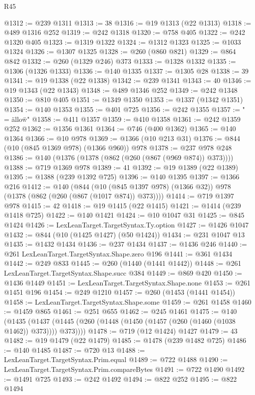 \begin{lexlean}{R45}
\begin{coremodule}
@1312 := @239 @1311
@1313 := 38
@1316 := @19 @1313 (@22 @1313)
@1318 := @489 @1316 @252
@1319 := @242 @1318
@1320 := @758 @405
@1322 := @242 @1320 @405
@1323 := @1319 @1322
@1324 := @1312 @1323
@1325 := @1033 @1324
@1326 := @1307 @1325
@1328 := @260 (@860 @821)
@1329 := @864 @842
@1332 := @260 (@1329 @246) @373
@1333 := @1328 @1332
@1335 := @1306 (@1326 @1333)
@1336 := @140 @1335
@1337 := @1305 @28
@1338 := 39
@1341 := @19 @1338 (@22 @1338)
@1342 := @239 @1341
@1343 := 40
@1346 := @19 @1343 (@22 @1343)
@1348 := @489 @1346 @252
@1349 := @242 @1348
@1350 := @810 @405
@1351 := @1349 @1350
@1353 := @1337 (@1342 @1351)
@1354 := @140 @1353
@1355 := @401 @725
@1356 := @242 @1355
@1357 := " = \"allow\"\n"
@1358 := @411 @1357
@1359 := @410 @1358
@1361 := @242 @1359 @252
@1362 := @1356 @1361
@1364 := @746 (@400 @1362)
@1365 := @140 @1364
@1366 := @10 @978
@1369 := @1366 (@10 @213 @31)
@1376 := @844 (@10 (@845 @1369 @978) (@1366 @960)) @978
@1378 := @237 @978 @248
@1386 := @140 (@1376 (@1378 (@862 (@260 (@867 (@969 @874)) @373))))
@1388 := @719 @1369 @978
@1389 := 41
@1392 := @19 @1389 (@22 @1389)
@1395 := @1388 (@239 @1392 @725)
@1396 := @140 @1395
@1397 := @1366 @216
@1412 := @140
    (@844 (@10 (@845 @1397 @978) (@1366 @32)) @978 (@1378 (@862 (@260 (@867 (@1017 @874)) @373))))
@1414 := @719 @1397 @978
@1415 := 42
@1418 := @19 @1415 (@22 @1415)
@1421 := @1414 (@239 @1418 @725)
@1422 := @140 @1421
@1424 := @10 @1047 @31
@1425 := @845 @1424
@1426 := LexLeanTarget.TargetSyntax.Ty.option
@1427 := @1426 @1047
@1432 := @844 (@10 (@1425 @1427) (@50 @1424))
@1434 := @231 @1047 @13
@1435 := @1432 @1434
@1436 := @237 @1434
@1437 := @1436 @246
@1440 := @261 LexLeanTarget.TargetSyntax.Shape.zero @196
@1441 := @361 @1434
@1442 := @249 @833
@1445 := @260 (@1440 (@1441 @1442))
@1448 := @261 LexLeanTarget.TargetSyntax.Shape.succ @384
@1449 := @869 @420
@1450 := @1436 @1449
@1451 := LexLeanTarget.TargetSyntax.Shape.none
@1453 := @261 @1451 @196
@1454 := @249 @1210
@1457 := @260 (@1453 (@1441 @1454))
@1458 := LexLeanTarget.TargetSyntax.Shape.some
@1459 := @261 @1458
@1460 := @1459 @865
@1461 := @251 @655
@1462 := @245 @1461
@1475 := @140
    (@1435 (@1437 (@1445 (@260 (@1448 (@1450 (@1457 (@260 (@1460 (@1038 @1462)) @373)))) @373))))
@1478 := @719 (@12 @1424) @1427
@1479 := 43
@1482 := @19 @1479 (@22 @1479)
@1485 := @1478 (@239 @1482 @725)
@1486 := @140 @1485
@1487 := @720 @13
@1488 := LexLeanTarget.TargetSyntax.Prim.equal
@1489 := @722 @1488
@1490 := LexLeanTarget.TargetSyntax.Prim.compareBytes
@1491 := @722 @1490
@1492 := @1491 @725
@1493 := @242 @1492
@1494 := @822 @252
@1495 := @822 @1494

\end{coremodule}
\end{lexlean}
